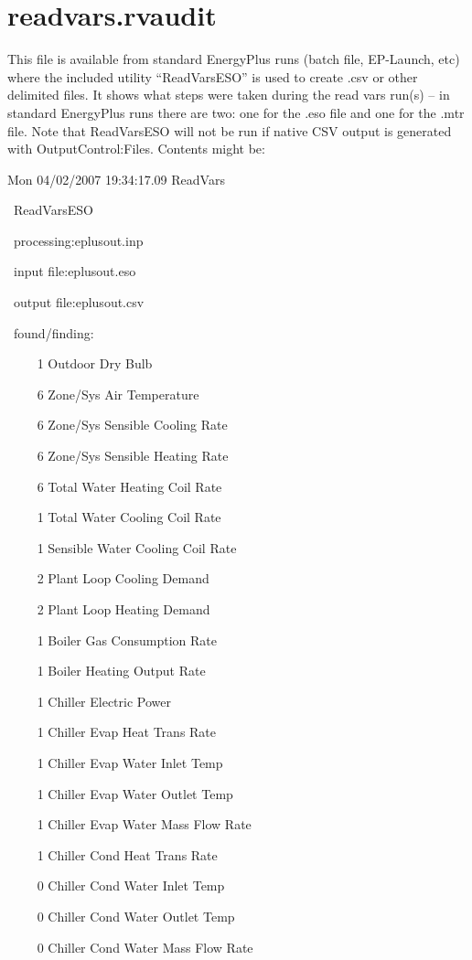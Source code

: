 \section{readvars.rvaudit}\label{readvars.rvaudit}

This file is available from standard EnergyPlus runs (batch file, EP-Launch, etc) where the included utility ``ReadVarsESO'' is used to create .csv or other delimited files. It shows what steps were taken during the read vars run(s) -- in standard EnergyPlus runs there are two: one for the .eso file and one for the .mtr file. Note that ReadVarsESO will not be run if native CSV output is generated with  OutputControl:Files. Contents might be:

Mon 04/02/2007 19:34:17.09 ReadVars

~ReadVarsESO

~processing:eplusout.inp

~input file:eplusout.eso

~output file:eplusout.csv

~found/finding:

~~~~ 1 Outdoor Dry Bulb

~~~~ 6 Zone/Sys Air Temperature

~~~~ 6 Zone/Sys Sensible Cooling Rate

~~~~ 6 Zone/Sys Sensible Heating Rate

~~~~ 6 Total Water Heating Coil Rate

~~~~ 1 Total Water Cooling Coil Rate

~~~~ 1 Sensible Water Cooling Coil Rate

~~~~ 2 Plant Loop Cooling Demand

~~~~ 2 Plant Loop Heating Demand

~~~~ 1 Boiler Gas Consumption Rate

~~~~ 1 Boiler Heating Output Rate

~~~~ 1 Chiller Electric Power

~~~~ 1 Chiller Evap Heat Trans Rate

~~~~ 1 Chiller Evap Water Inlet Temp

~~~~ 1 Chiller Evap Water Outlet Temp

~~~~ 1 Chiller Evap Water Mass Flow Rate

~~~~ 1 Chiller Cond Heat Trans Rate

~~~~ 0 Chiller Cond Water Inlet Temp

~~~~ 0 Chiller Cond Water Outlet Temp

~~~~ 0 Chiller Cond Water Mass Flow Rate

